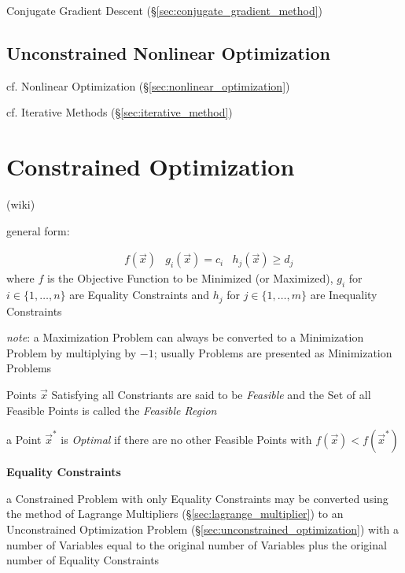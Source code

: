 Conjugate Gradient Descent (\S\ref{sec:conjugate_gradient_method})



\subsection{Unconstrained Nonlinear Optimization}
\label{sec:unconstrained_nonlinear}

\fist cf. Nonlinear Optimization (\S\ref{sec:nonlinear_optimization})

\fist cf. Iterative Methods (\S\ref{sec:iterative_method})



\section{Constrained Optimization}\label{sec:constrained_optimization}

(wiki)

general form:

\begin{align*}
  & f(\vec{x})
  & g_i(\vec{x}) = c_i
  & h_j(\vec{x}) \geq d_j
\end{align*}
where $f$ is the Objective Function to be Minimized (or Maximized), $g_i$ for
$i \in \{ 1, \ldots, n \}$ are Equality Constraints and $h_j$ for $j \in \{ 1,
\ldots, m \}$ are Inequality Constraints

\emph{note}: a Maximization Problem can always be converted to a Minimization
Problem by multiplying by $-1$; usually Problems are presented as Minimization
Problems

Points $\vec{x}$ Satisfying all Constriants are said to be \emph{Feasible}
and the Set of all Feasible Points is called the \emph{Feasible Region}

a Point $\vec{x}^*$ is \emph{Optimal} if there are no other Feasible Points
with $f(\vec{x}) < f(\vec{x}^*)$


\textbf{Equality Constraints}

a Constrained Problem with only Equality Constraints may be converted using the
method of Lagrange Multipliers (\S\ref{sec:lagrange_multiplier}) to an
Unconstrained Optimization Problem (\S\ref{sec:unconstrained_optimization})
with a number of Variables equal to the original number of Variables plus the
original number of Equality Constraints

